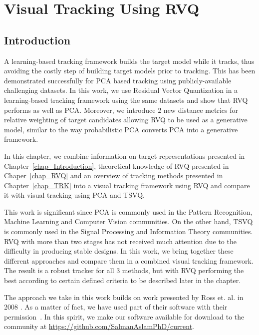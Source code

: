\chapter{Visual Tracking Using RVQ}
\label{chap_RVQ_TRK}	
\section{Introduction}
A learning-based tracking framework builds the target model while it tracks, thus avoiding the costly step of building target models prior to tracking.  This has been demonstrated successfully for PCA based tracking using publicly-available challenging datasets.  In this work, we use Residual Vector Quantization in a learning-based tracking framework using the same datasets and show that RVQ performs as well as PCA.  Moreover, we introduce 2 new distance metrics for relative weighting of target candidates allowing RVQ to be used as a generative model, similar to the way probabilistic PCA converts PCA into a generative framework.

In this chapter, we combine information on target representations presented in Chapter~\ref{chap_Introduction}, theoretical knowledge of RVQ presented in Chaper~\ref{chap_RVQ} and an overview of tracking methods presented in Chapter~\ref{chap_TRK} into a visual tracking framework using RVQ and compare it with visual tracking using PCA and TSVQ.  

This work is significant since PCA is commonly used in the Pattern Recognition, Machine Learning and Computer Vision communities.  On the other hand, TSVQ is commonly used in the Signal Processing and Information Theory communities.  RVQ with more than two stages has not received much attention due to the difficulty in producing stable designs.  In this work, we bring together these different approaches and compare them in a combined visual tracking framework.  The result is a robust tracker for all 3 methods, but with RVQ performing the best according to certain defined criteria to be described later in the chapter.

The approach we take in this work builds on work presented by Ross et. al. in 2008 \cite{2008_JNL_subspaceTRK_Ross}.  As a matter of fact, we have used part of their software with their permission~\cite{2008_SFT_Ross}.  In this spirit, we make our software available for download to the community at \url{https://github.com/SalmanAslamPhD/current}.  


